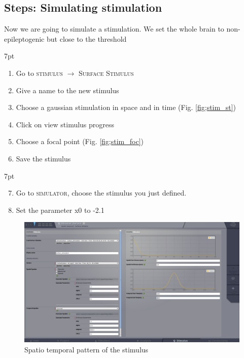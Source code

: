 \documentclass{tufte-handout}
\newenvironment{formal}{%
  \def\FrameCommand{%
    \hspace{1pt}%
    {\color{DarkBlue}\vrule width 2pt}%
    {\color{formalshade}\vrule width 4pt}%
    \colorbox{formalshade}%
  }%
  \MakeFramed{\advance\hsize-\width\FrameRestore}%
  \noindent\hspace{-4.55pt}%
  \begin{adjustwidth}{}{7pt}%
  \vspace{2pt}\vspace{2pt}%
}
{%
  \vspace{2pt}\end{adjustwidth}\endMakeFramed%
}
\newenvironment{simulation}{%
  \def\FrameCommand{%
    \hspace{1pt}%
    {\color{ForestGreen}\vrule width 2pt}%
    {\color{simulationshade}\vrule width 4pt}%
    \colorbox{simulationshade}%
  }%
  \MakeFramed{\advance\hsize-\width\FrameRestore}%
  \noindent\hspace{-4.55pt}%
  \begin{adjustwidth}{}{7pt}%
  \vspace{2pt}\vspace{2pt}%
}
{%
  \vspace{2pt}\end{adjustwidth}\endMakeFramed%
}
\begin{document}
\subsection{Steps: Simulating stimulation}

Now we are going to simulate a stimulation.
We  set the whole brain to non-epileptogenic but close to the threshold

  \begin{formal}
  \begin{enumerate}
  \item Go to \textsc{stimulus} $\rightarrow$ \textsc{Surface Stimulus}
  \item Give a name to the new stimulus
  \item Choose a gaussian stimulation in space and in time (Fig. \ref{fig;stim_st})
  \item Click on view stimulus progress
  \item Choose a focal point (Fig. \ref{fig;stim_foc})
  \item Save the stimulus
  \end{enumerate}
\end{formal}
  \begin{simulation}
  \begin{enumerate}
  \setcounter{enumi}{6}
  \item Go to \textsc{simulator}, choose the stimulus you just defined.
  \item Set the parameter x0 to -2.1
 
\end{enumerate}
\end{simulation}

\begin{figure}[h]
  \includegraphics[width=\linewidth]{Handout_UI_ModellingAnEpilepticPatient_StimulationSpatioTemporalPattern}%
  \caption{Spatio temporal pattern of the stimulus}%
  \label{fig:stim_st}%
\end{figure}
\end{document}

